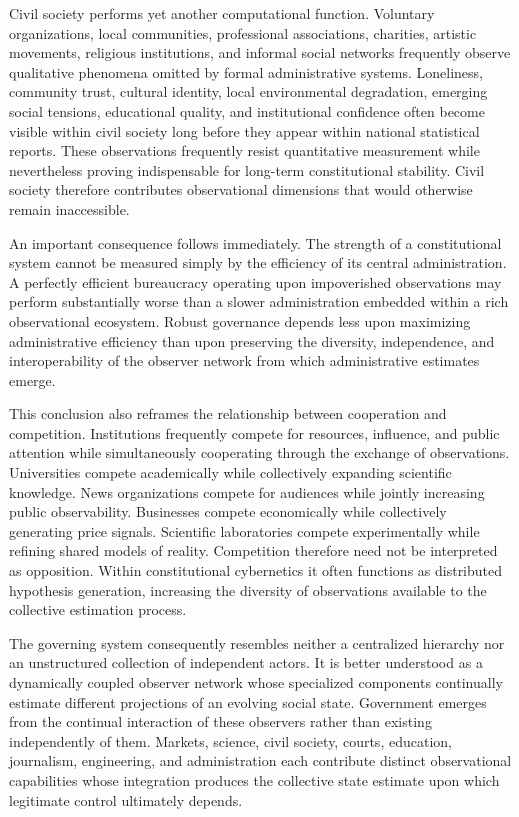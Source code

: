 \documentclass[12pt,a4paper]{article}
\begin{document}
Civil society performs yet another computational function. Voluntary organizations, local communities, professional associations, charities, artistic movements, religious institutions, and informal social networks frequently observe qualitative phenomena omitted by formal administrative systems. Loneliness, community trust, cultural identity, local environmental degradation, emerging social tensions, educational quality, and institutional confidence often become visible within civil society long before they appear within national statistical reports. These observations frequently resist quantitative measurement while nevertheless proving indispensable for long-term constitutional stability. Civil society therefore contributes observational dimensions that would otherwise remain inaccessible.

An important consequence follows immediately. The strength of a constitutional system cannot be measured simply by the efficiency of its central administration. A perfectly efficient bureaucracy operating upon impoverished observations may perform substantially worse than a slower administration embedded within a rich observational ecosystem. Robust governance depends less upon maximizing administrative efficiency than upon preserving the diversity, independence, and interoperability of the observer network from which administrative estimates emerge.

This conclusion also reframes the relationship between cooperation and competition. Institutions frequently compete for resources, influence, and public attention while simultaneously cooperating through the exchange of observations. Universities compete academically while collectively expanding scientific knowledge. News organizations compete for audiences while jointly increasing public observability. Businesses compete economically while collectively generating price signals. Scientific laboratories compete experimentally while refining shared models of reality. Competition therefore need not be interpreted as opposition. Within constitutional cybernetics it often functions as distributed hypothesis generation, increasing the diversity of observations available to the collective estimation process.

The governing system consequently resembles neither a centralized hierarchy nor an unstructured collection of independent actors. It is better understood as a dynamically coupled observer network whose specialized components continually estimate different projections of an evolving social state. Government emerges from the continual interaction of these observers rather than existing independently of them. Markets, science, civil society, courts, education, journalism, engineering, and administration each contribute distinct observational capabilities whose integration produces the collective state estimate upon which legitimate control ultimately depends.
\end{document}
